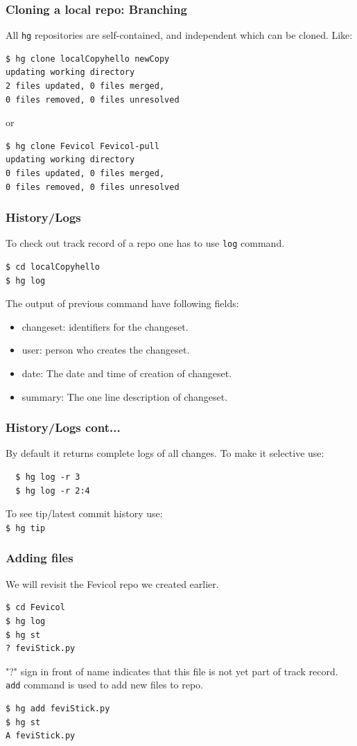 \documentclass[14pt,compress]{beamer}
\newcounter{time}
\newcommand{\inctime}[1]{\addtocounter{time}{#1}{\tiny \thetime\ m}}
\newcommand{\typ}[1]{\lstinline{#1}}
\begin{document}
\begin{frame}[fragile]
  \frametitle{Cloning a local repo: Branching}
  All \typ{hg} repositories are self-contained, and independent which can be cloned. Like:
  \begin{lstlisting}
$ hg clone localCopyhello newCopy
updating working directory
2 files updated, 0 files merged, 
0 files removed, 0 files unresolved
  \end{lstlisting}
  or
  \begin{lstlisting}
$ hg clone Fevicol Fevicol-pull
updating working directory
0 files updated, 0 files merged, 
0 files removed, 0 files unresolved
  \end{lstlisting}
  \inctime{15}
\end{frame}

\begin{frame}[fragile]
  \frametitle{History/Logs}
  To check out track record of a repo one has to use \typ{log} command.
  \begin{lstlisting}
$ cd localCopyhello
$ hg log    
  \end{lstlisting}
  The output of previous command have following fields:
  \begin{itemize}
  \item changeset: identifiers for the changeset.
  \item user: person who creates the changeset.
  \item date: The date and time of creation of changeset.
  \item summary: The one line description of changeset.
  \end{itemize}
\end{frame}

\begin{frame}[fragile]
  \frametitle{History/Logs cont...}
By default it returns complete logs of all changes. To make it selective use:
\begin{lstlisting}
  $ hg log -r 3
  $ hg log -r 2:4
\end{lstlisting}
  To see tip/latest commit history use:\\
\typ{$ hg tip} \\ %
  \inctime{5}
\end{frame}

\begin{frame}[fragile]
  \frametitle{Adding files}
  We will revisit the Fevicol repo we created earlier.
  \begin{lstlisting}
$ cd Fevicol
$ hg log
$ hg st
? feviStick.py
  \end{lstlisting} %
  "?" sign in front of name indicates that this file is not yet part of track record. \typ{add} command is used to add new files to repo.
  \begin{lstlisting}
$ hg add feviStick.py
$ hg st
A feviStick.py
  \end{lstlisting}
\end{frame}
\end{document}

